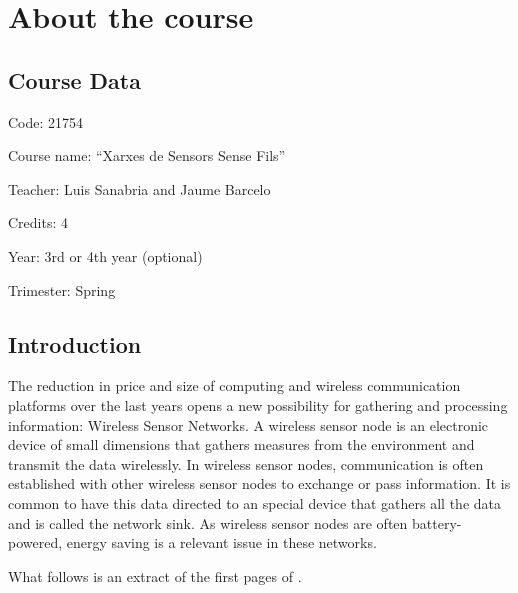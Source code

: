 \chapter{About the course}

\section{Course Data}

Code: 21754

Course name: ``Xarxes de Sensors Sense Fils''

Teacher: Luis Sanabria and Jaume Barcelo

Credits: 4

Year: 3rd or 4th year (optional)

Trimester: Spring

\section{Introduction}
The reduction in price and size of computing and wireless communication platforms over the last years opens a new possibility for gathering and processing information: Wireless Sensor Networks.
A wireless sensor node is an electronic device of small dimensions that gathers measures from the environment and transmit the data wirelessly.
In wireless sensor nodes, communication is often established with other wireless sensor nodes to exchange or pass information.
It is common to have this data directed to an special device that gathers all the data and is called the network sink.
As wireless sensor nodes are often battery-powered, energy saving is a relevant issue in these networks.

What follows is an extract of the first pages of \cite{sanabria2012lpw}.

